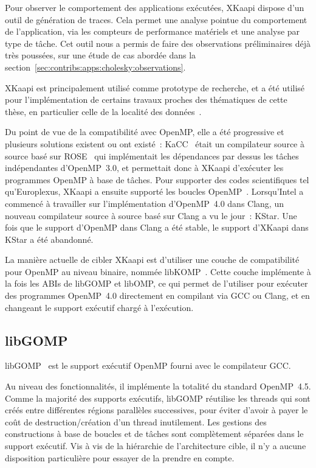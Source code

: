 Pour observer le comportement des applications exécutées, XKaapi dispose d'un outil de génération de traces.
Cela permet une analyse pointue du comportement de l'application, via les compteurs de performance matériels et une analyse par type de tâche.
Cet outil nous a permis de faire des observations préliminaires déjà très poussées, sur une étude de cas abordée dans la section~\ref{sec:contribs:apps:cholesky:observations}.

XKaapi est principalement utilisé comme prototype de recherche, et a été utilisé pour l'implémentation de certains travaux proches des thématiques de cette thèse, en particulier celle de la localité des données~\cite{Durand2013, Bleuse2014, Lima2015}.

Du point de vue de la compatibilité avec OpenMP, elle a été progressive et plusieurs solutions existent ou ont existé~: KaCC~\cite{Lementec2011} était un compilateur source à source basé sur ROSE~\cite{Quinlan2003} qui implémentait les dépendances par dessus les tâches indépendantes d'OpenMP~3.0, et permettait donc à XKaapi d'exécuter les programmes OpenMP à base de tâches.
Pour supporter des codes scientifiques tel qu'Europlexus, XKaapi a ensuite supporté les boucles OpenMP~\cite{Gautier2013b}.
Lorsqu'Intel a commencé à travailler sur l'implémentation d'OpenMP~4.0 dans Clang, un nouveau compilateur source à source basé sur Clang a vu le jour~: KStar.
Une fois que le support d'OpenMP dans Clang a été stable, le support d'XKaapi dans KStar a été abandonné.

La manière actuelle de cibler XKaapi est d'utiliser une couche de compatibilité pour OpenMP au niveau binaire, nommée libKOMP~\cite{Broquedis2012}.
Cette couche implémente à la fois les ABIs de libGOMP et libOMP, ce qui permet de l'utiliser pour exécuter des programmes OpenMP~4.0 directement en compilant via GCC ou Clang, et en changeant le support exécutif chargé à l'exécution.



\subsection{libGOMP}

libGOMP~\cite{Novillo2006} est le support exécutif OpenMP fourni avec le compilateur GCC.

Au niveau des fonctionnalités, il implémente la totalité du standard OpenMP~4.5.
Comme la majorité des supports exécutifs, libGOMP réutilise les threads qui sont créés entre différentes régions parallèles successives, pour éviter d'avoir à payer le coût de destruction/création d'un thread inutilement.
Les gestions des constructions à base de boucles et de tâches sont complètement séparées dans le support exécutif.
Vis à vis de la hiérarchie de l'architecture cible, il n'y a aucune disposition particulière pour essayer de la prendre en compte.

